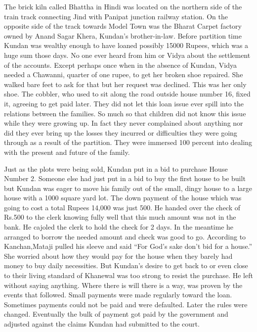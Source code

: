 The brick kiln called Bhattha in Hindi was located on the northern side of the train track connecting Jind with Panipat junction railway station. On the opposite side of the track towards Model Town  was the Bharat Carpet factory owned by Anand Sagar Khera, Kundan’s brother-in-law. Before partition time Kundan was wealthy enough to have loaned possibly 15000 Rupees, which was a huge sum those days. No one ever heard from him or Vidya about the settlement of the accounts. Except perhaps once when in the absence of Kundan, Vidya needed a Chawanni, quarter of one rupee, to get her broken shoe repaired. She walked bare feet to ask for that but her request was declined. This was her only shoe. The cobbler, who used to sit along the road outside house number 16, fixed it, agreeing to get paid later. They did not let this loan issue ever spill into the relations between the families. So much so that children did not know this issue while they were growing up. In fact they never complained about anything nor did they ever bring up the losses they incurred or difficulties they were going through as a result of the partition. They were immersed 100 percent into dealing with the present and future of the family.

Just as the plots were being sold, Kundan put in a bid to purchase House Number 2. Someone else had just put in a bid to buy the first house to be built but Kundan was eager to move his family out of the small, dingy house to a large house with a 1000 square yard lot. The down payment of the house which was going to cost a total Rupees 14,000 was just 500. He handed over the check of Rs.500 to the clerk knowing fully well that this much amount was not in the bank. He cajoled the clerk to hold the check for 2 days. In the meantime he arranged to borrow the needed amount and check was good to go. According to Kanchan,Mataji pulled his sleeve and said “For God’s sake don’t bid for a house.” She worried about how they would pay for the house when they barely had money to buy daily necessities. But Kundan's desire to get back to or even close to their living standard of Khanewal was too strong to resist the purchase. He left without saying anything. Where there is will there is a way, was proven by the events that followed. Small payments were made regularly toward the loan. Sometimes payments could not be paid and were defaulted. Later the rules were changed. Eventually the bulk of payment got paid by the government and adjusted against the claims Kundan had submitted to the court. 

